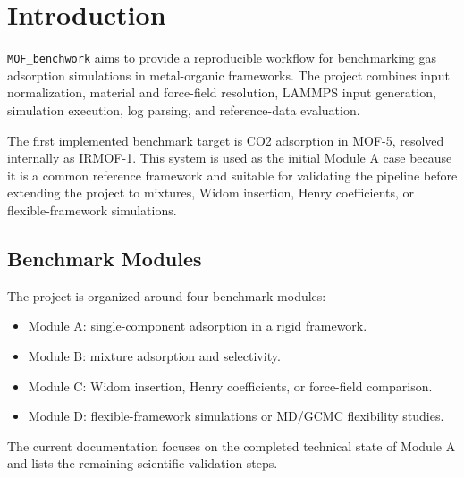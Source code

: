\section{Introduction}

\texttt{MOF\_benchwork} aims to provide a reproducible workflow for benchmarking gas adsorption simulations in metal-organic frameworks.
The project combines input normalization, material and force-field resolution, LAMMPS input generation, simulation execution, log parsing, and reference-data evaluation.

The first implemented benchmark target is CO2 adsorption in MOF-5, resolved internally as IRMOF-1.
This system is used as the initial Module A case because it is a common reference framework and suitable for validating the pipeline before extending the project to mixtures, Widom insertion, Henry coefficients, or flexible-framework simulations.

\subsection{Benchmark Modules}

The project is organized around four benchmark modules:

\begin{itemize}
    \item Module A: single-component adsorption in a rigid framework.
    \item Module B: mixture adsorption and selectivity.
    \item Module C: Widom insertion, Henry coefficients, or force-field comparison.
    \item Module D: flexible-framework simulations or MD/GCMC flexibility studies.
\end{itemize}

The current documentation focuses on the completed technical state of Module A and lists the remaining scientific validation steps.
